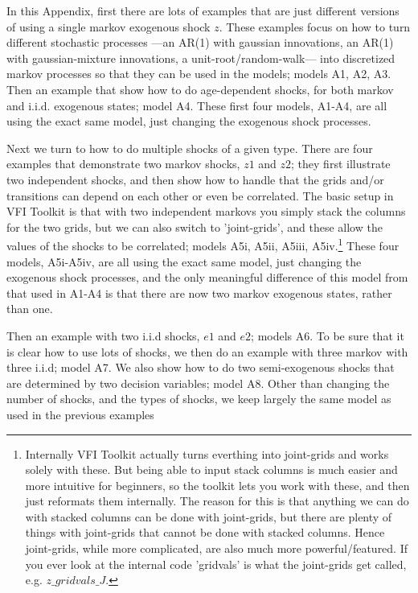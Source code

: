 In this Appendix, first there are lots of examples that are just different versions of using a single markov exogenous shock $z$. These examples focus on how to turn different stochastic processes ---an AR(1) with gaussian innovations, an AR(1) with gaussian-mixture innovations, a unit-root/random-walk--- into discretized markov processes so that they can be used in the models; models A1, A2, A3. Then an example that show how to do age-dependent shocks, for both markov and i.i.d. exogenous states; model A4. These first four models, A1-A4, are all using the exact same model, just changing the exogenous shock processes.

Next we turn to how to do multiple shocks of a given type. There are four examples that demonstrate two markov shocks, $z1$ and $z2$; they first illustrate two independent shocks, and then show how to handle that the grids and/or transitions can depend on each other or even be correlated. The basic setup in VFI Toolkit is that with two independent markovs you simply stack the columns for the two grids, but we can also switch to 'joint-grids', and these allow the values of the shocks to be correlated; models A5i, A5ii, A5iii, A5iv.\footnote{Internally VFI Toolkit actually turns everthing into joint-grids and works solely with these. But being able to input stack columns is much easier and more intuitive for beginners, so the toolkit lets you work with these, and then just reformats them internally. The reason for this is that anything we can do with stacked columns can be done with joint-grids, but there are plenty of things with joint-grids that cannot be done with stacked columns. Hence joint-grids, while more complicated, are also much more powerful/featured. If you ever look at the internal code 'gridvals' is what the joint-grids get called, e.g. $z\_{}gridvals\_{}J$.} These four models, A5i-A5iv, are all using the exact same model, just changing the exogenous shock processes, and the only meaningful difference of this model from that used in A1-A4 is that there are now two markov exogenous states, rather than one.

Then an example with two i.i.d shocks, $e1$ and $e2$; models A6. To be sure that it is clear how to use lots of shocks, we then do an example with three markov with three i.i.d; model A7. We also show how to do two semi-exogenous shocks that are determined by two decision variables; model A8. Other than changing the number of shocks, and the types of shocks, we keep largely the same model as used in the previous examples

